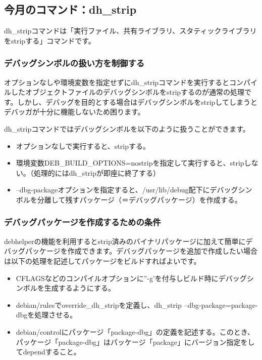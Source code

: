 \documentclass[mingoth,a4paper]{jsarticle}
\begin{document}
\newpage

\subsection{今月のコマンド：dh\_strip}
dh\_stripコマンドは「実行ファイル、共有ライブラリ、スタティックライブラリをstripする」コマンドです。

\subsubsection{デバッグシンボルの扱い方を制御する}
オプションなしや環境変数を指定せずにdh\_stripコマンドを実行するとコンパイルしたオブジェクトファイルのデバッグシンボルをstripするのが通常の処理です。しかし、デバッグを目的とする場合はデバッグシンボルをstripしてしまうとデバッガが十分に機能しないため困ります。

dh\_stripコマンドではデバッグシンボルを以下のように扱うことができます。\cite{debugpackage}

\begin{itemize}
 \item オプションなしで実行すると、stripする。
 \item 環境変数DEB\_BUILD\_OPTIONS=nostripを指定して実行すると、stripしない。（処理的にはdh\_stripが即座に終了する）
 \item --dbg-packageオプションを指定すると、/usr/lib/debug配下にデバッグシンボルを分離して残すパッケージ（＝デバッグパッケージ）を作成する。
\end{itemize}

\subsubsection{デバッグパッケージを作成するための条件}
debhelperの機能を利用するとstrip済みのバイナリパッケージに加えて簡単にデバッグパッケージを作成できます。デバッグパッケージを追加で作成したい場合は以下の処理を記述してパッケージをビルドすればよいです。

\begin{itemize}
 \item CFLAGSなどのコンパイルオプションに''-g'を付与しビルド時にデバッグシンボルを生成するようにする。
 \item debian/rulesでoverride\_dh\_stripを定義し、dh\_strip --dbg-package=package-dbgを処理させる。
 \item debian/controlにパッケージ「package-dbg」の定義を記述する。このとき、パッケージ「package-dbg」はパッケージ「package」にバージョン指定をしてdependすること。
\end{itemize}
\end{document}

